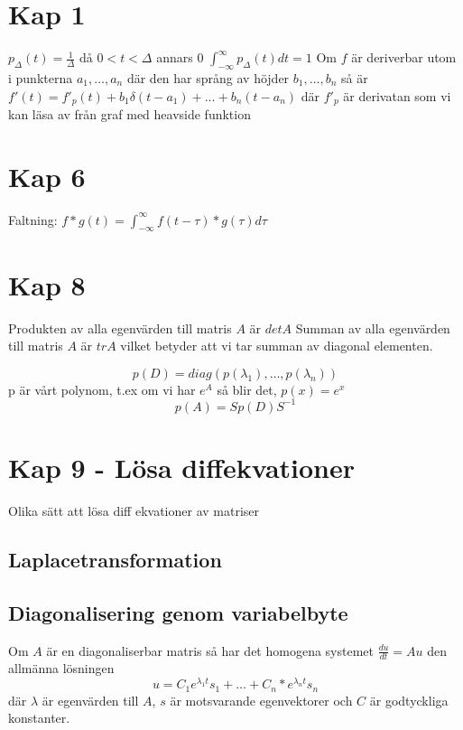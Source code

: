 \documentclass[twocolumn,a4paper]{article}
\begin{document}
\section*{Kap 1}

$p_{\Delta}(t) = \frac{1}{\Delta}$ då $0<t<\Delta$ annars 0
$\int^{\infty}_{-\infty} p_{\Delta}(t) dt = 1$
Om $f$ är deriverbar utom i punkterna $a_1, \ldots, a_n$ där den har språng av höjder $b_1,\ldots,b_n$ så är
$f'(t) = f'_p(t) + b_1\delta(t-a_1)+\ldots+b_n(t-a_n)$
där $f'_p$ är derivatan som vi kan läsa av från graf med heavside funktion

\section*{Kap 6}
Faltning: $f \ast g(t) = \int_{-\infty}^{\infty} f(t-\tau)*g(\tau) d\tau$

\section*{Kap 8}
Produkten av alla egenvärden till matris $A$ är $det A$ \newline
Summan av alla egenvärden till matris $A$ är $tr A$ vilket betyder att vi tar summan av diagonal elementen.

\begin{equation}
    p(D) = diag(p(\lambda_1),\ldots,p(\lambda_n))
\end{equation}
p är vårt polynom, t.ex om vi har $e^A$ så blir det, $p(x) = e^x$
\begin{equation}
    p(A) = Sp(D)S^{-1}
\end{equation}
\section*{Kap 9 - Lösa diffekvationer}
Olika sätt att lösa diff ekvationer av matriser
\subsection*{ Laplacetransformation}

\subsection*{Diagonalisering genom variabelbyte}
Om $A$ är en diagonaliserbar matris så har det homogena systemet $\frac{du}{dt} = Au$ den allmänna lösningen
\begin{equation}
    u=C_1e^{\lambda_1t}s_1+\ldots+C_n*e^{\lambda_nt}s_n
\end{equation}
där $\lambda$ är egenvärden till $A$, $s$ är motsvarande egenvektorer och $C$ är godtyckliga konstanter. 
\end{document}
